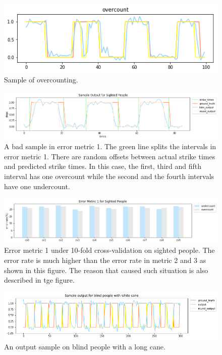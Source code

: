 \documentclass[11pt]{article}
\begin{document}
\begin{figure}[ht]
\centering
\includegraphics[scale=0.4]{overcount}
\caption{Sample of overcounting.}
\label{fig:overcount}
\end{figure}


\begin{figure}[ht]
\centering
\includegraphics[scale=0.5]{output_small_metric2}
\caption{A bad sample in error metric 1. The green line splits the intervals in error metric 1. There are random offsets between actual strike times and predicted strike times. In this case, the first, third and fifth interval has one overcount while the second and the fourth intervals have one undercount.}
\label{fig:output_small_metric2}
\end{figure}




\begin{figure}[ht]
\centering
\includegraphics[scale=0.5]{error_metric_1_na_10fold}
\caption{Error metric 1 under 10-fold cross-validation on sighted people. The error rate is much higher than the error rate in metric 2 and 3 as shown in this figure. The reason that caused such situation is also described in tge figure.}
\label{fig:error_metric_1_na_10fold}
\end{figure}


\begin{figure}[ht]
\centering
\includegraphics[scale=0.5]{output_wc_1}
\caption{An output sample on blind people with a long cane.}
\label{fig:output_wc_1}
\end{figure}
\end{document}
